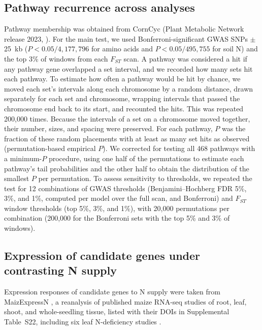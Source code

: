 \documentclass[11pt]{article}
\begin{document}
\subsection*{Pathway recurrence across analyses}
Pathway membership was obtained from CornCyc (Plant Metabolic Network release 2023, \citealp{Hawkins2021PMN}). For the main test, we used Bonferroni-significant GWAS SNPs $\pm$25~kb ($P < 0.05/4{,}177{,}796$ for amino acids and $P < 0.05/495{,}755$ for soil N) and the top 3\% of windows from each $F_{ST}$ scan. A pathway was considered a hit if any pathway gene overlapped a set interval, and we recorded how many sets hit each pathway. To estimate how often a pathway would be hit by chance, we moved each set’s intervals along each chromosome by a random distance, drawn separately for each set and chromosome, wrapping intervals that passed the chromosome end back to its start, and recounted the hits. This was repeated 200,000 times. Because the intervals of a set on a chromosome moved together, their number, sizes, and spacing were preserved. For each pathway, $P$ was the fraction of these random placements with at least as many set hits as observed (permutation-based empirical $P$). We corrected for testing all 468 pathways with a minimum-$P$ procedure, using one half of the permutations to estimate each pathway’s tail probabilities and the other half to obtain the distribution of the smallest $P$ per permutation. To assess sensitivity to thresholds, we repeated the test for 12 combinations of GWAS thresholds (Benjamini--Hochberg FDR 5\%, 3\%, and 1\%, computed per model over the full scan, and Bonferroni) and $F_{ST}$ window thresholds (top 5\%, 3\%, and 1\%), with 20,000 permutations per combination (200,000 for the Bonferroni sets with the top 5\% and 3\% of windows).

\subsection*{Expression of candidate genes under contrasting N supply}
Expression responses of candidate genes to N supply were taken from MaizExpressN \citep{MaizExpressN}, a reanalysis of published maize RNA-seq studies of root, leaf, shoot, and whole-seedling tissue, listed with their DOIs in Supplemental Table~S22, including six leaf N-deficiency studies \citep{Mu2017LN, Guo2022LN, Ma2021LN, TorresRodriguez2021LN, AlonsoNieves2022LN, Wang2025NRT25}.

\clearpage
\end{document}
